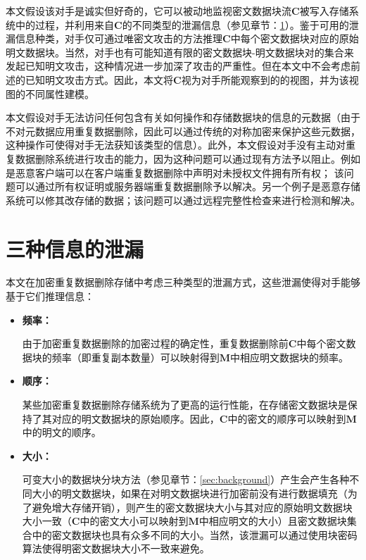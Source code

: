   
本文假设该对手是诚实但好奇的，它可以被动地监视密文数据块流$\mathbf{C}$被写入存储系统中的过程，并利用来自$\mathbf{C}$的不同类型的泄漏信息（参见章节：\ref{sec:ThreatModel-Leakage}）。鉴于可用的泄漏信息种类，对手仅可通过唯密文攻击的方法推理$\mathbf{C}$中每个密文数据块对应的原始明文数据块。当然，对手也有可能知道有限的密文数据块-明文数据块对的集合来发起已知明文攻击，这种情况进一步加深了攻击的严重性。但在本文中不会考虑前述的已知明文攻击方式。因此，本文将$\mathbf{C}$视为对手所能观察到的的视图，并为该视图的不同属性建模。

本文假设对手无法访问任何包含有关如何操作和存储数据块的信息的元数据（由于不对元数据应用重复数据删除，因此可以通过传统的对称加密来保护这些元数据，这种操作可使得对手无法获知该类型的信息）。此外，本文假设对手没有主动对重复数据删除系统进行攻击的能力，因为这种问题可以通过现有方法予以阻止。例如是恶意客户端可以在客户端重复数据删除中声明对未授权文件拥有所有权； 该问题可以通过所有权证明或服务器端重复数据删除予以解决。另一个例子是恶意存储系统可以修其改存储的数据；该问题可以通过远程完整性检查来进行检测和解决。

\section{三种信息的泄漏}
\label{sec:ThreatModel-Leakage}

本文在加密重复数据删除存储中考虑三种类型的泄漏方式，这些泄漏使得对手能够基于它们推理信息：

\begin{itemize}
    \item \textbf{频率：}  

    由于加密重复数据删除的加密过程的确定性，重复数据删除前$\mathbf{C}$中每个密文数据块的频率（即重复副本数量）可以映射得到$\mathbf{M}$中相应明文数据块的频率。

    \item \textbf{顺序：} 
 
    某些加密重复数据删除存储系统为了更高的运行性能，在存储密文数据块是保持了其对应的明文数据块的原始顺序。因此，$\mathbf{C}$中的密文的顺序可以映射到$\mathbf{M}$中的明文的顺序。

    \item \textbf{大小：} 

    可变大小的数据块分块方法（参见章节：\ref{sec:background}）产生会产生各种不同大小的明文数据块，如果在对明文数据块进行加密前没有进行数据填充（为了避免增大存储开销），则产生的密文数据块大小与其对应的原始明文数据块大小一致（$\mathbf{C}$中的密文大小可以映射到$\mathbf{M}$中相应明文的大小）且密文数据块集合中的密文数据块也具有众多不同的大小。当然，该泄漏可以通过使用块密码算法使得明密文数据块大小不一致来避免。
\end{itemize}

